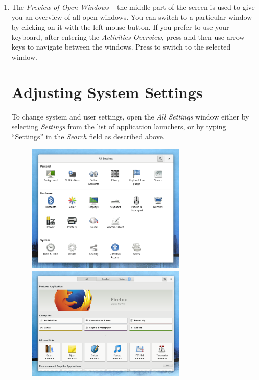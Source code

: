 \begin{enumerate}
\item The \emph{Preview of Open Windows} -- the middle part of the screen is used to give you an overview of all open windows. You can switch to a particular window by clicking on it with the left mouse button. If you prefer to use your keyboard, after entering the \emph{Activities Overview}, press  and then use arrow keys to navigate between the windows. Press  to switch to the selected window.

\section*{Adjusting System Settings}

To change system and user settings, open the \emph{All Settings} window either by selecting \emph{Settings} from the list of application launchers, or by typing \enquote{Settings} in the \emph{Search} field as described above.


\begin{figure}[p]
\begin{center}
\includegraphics[width=0.72\textwidth]{img/settings}
 \label{fig:settings}
\bigskip
\includegraphics[width=0.72\textwidth]{img/software}
 \label{fig:software}
\end{center}
\end{figure}


\end{enumerate}
